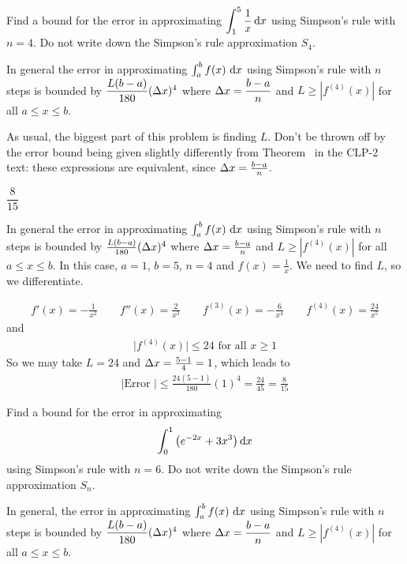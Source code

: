 \begin{question}[M105 2013A]
Find a bound for the error in approximating
$\displaystyle\int_1^5 \frac{1}{x}\,\mathrm{d}x$ using Simpson's rule with $n = 4$.
Do not write down the Simpson's rule approximation $S_4$.

In general the error in approximating
$\int_a^b f(x)\ \mathrm{d}x$ using Simpson's rule with $n$
steps is bounded by $\dfrac{L(b-a)}{180}(\Delta x)^4$ where $\Delta x=\dfrac{b-a}{n}$
and $L\ge |f^{(4)}(x)|$ for all $a\le x\le b$.
\end{question}

\begin{hint}
As usual, the biggest part of this problem is finding $L$. Don't be thrown off by the error bound being given slightly differently from Theorem~ in the CLP-2 text: these expressions are equivalent, since $\Delta x = \frac{b-a}{n}$.
\end{hint}

\begin{answer}
$\dfrac{8}{15}$
\end{answer}

\begin{solution}
In general the error in approximating
$\int_a^b f(x)\ \mathrm{d}x$ using Simpson's rule with $n$
steps is bounded by $\frac{L(b-a)}{180}(\Delta x)^4$ where $\Delta x=\frac{b-a}{n}$
and $L\ge |f^{(4)}(x)|$ for all $a\le x\le b$. In this case, $a=1$, $b=5$,
$n=4$ and $f(x)=\frac{1}{x}$. We need to find $L$, so we differentiate.

\begin{align*}
f'(x)=-\frac{1}{x^2}\qquad
f''(x)=\frac{2}{x^3}\qquad
f^{(3)}(x)=-\frac{6}{x^4}\qquad
f^{(4)}(x)=\frac{24}{x^5}
\end{align*}
and
\begin{align*}
\big|f^{(4)}(x)\big|\le 24\text{ for all }x\ge 1
\end{align*}
So we may take $L=24$ and $\Delta x=\frac{5-1}{4}=1$, which leads to
\begin{align*}
|\text{Error }|\le \frac{24(5-1)}{180}(1)^4=\frac{24}{45}=\frac{8}{15}
\end{align*}
\end{solution}


\begin{Mquestion}[M105 2012A]
Find a bound for the error in approximating
\begin{equation*}
\int_0^1 \big(e^{-2x}+3x^3\big)\,\mathrm{d}x
\end{equation*}
using Simpson's rule with $n = 6$.
Do not write down the Simpson's rule approximation $S_n$.

In general, the error in approximating
$\int_a^b f(x)\ \mathrm{d}x$ using Simpson's rule with $n$
steps is bounded by $\dfrac{ L(b-a)}{180}(\Delta x)^4$ where $\Delta x=\dfrac{b-a}{n}$
and $L\ge |f^{(4)}(x)|$ for all $a\le x\le b$.
\end{Mquestion}

